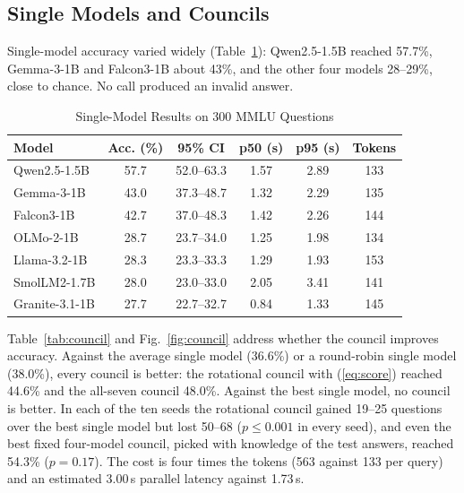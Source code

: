 \subsection{Single Models and Councils}
Single-model accuracy varied widely (Table~\ref{tab:models}): Qwen2.5-1.5B reached 57.7\%, Gemma-3-1B and Falcon3-1B about 43\%, and the other four models 28--29\%, close to chance. No call produced an invalid answer.

\begin{table}[t]
\caption{Single-Model Results on 300 MMLU Questions}
\label{tab:models}
\centering
\footnotesize
\setlength{\tabcolsep}{3.5pt}
\begin{tabular}{@{}lccccc@{}}
\toprule
Model & Acc. (\%) & 95\% CI & p50 (s) & p95 (s) & Tokens \\
\midrule
Qwen2.5-1.5B & 57.7 & 52.0--63.3 & 1.57 & 2.89 & 133 \\
Gemma-3-1B & 43.0 & 37.3--48.7 & 1.32 & 2.29 & 135 \\
Falcon3-1B & 42.7 & 37.0--48.3 & 1.42 & 2.26 & 144 \\
OLMo-2-1B & 28.7 & 23.7--34.0 & 1.25 & 1.98 & 134 \\
Llama-3.2-1B & 28.3 & 23.3--33.3 & 1.29 & 1.93 & 153 \\
SmolLM2-1.7B & 28.0 & 23.0--33.0 & 2.05 & 3.41 & 141 \\
Granite-3.1-1B & 27.7 & 22.7--32.7 & 0.84 & 1.33 & 145 \\
\bottomrule
\end{tabular}
\end{table}

Table~\ref{tab:council} and Fig.~\ref{fig:council} address whether the council improves accuracy. Against the average single model (36.6\%) or a round-robin single model (38.0\%), every council is better: the rotational council with (\ref{eq:score}) reached 44.6\% and the all-seven council 48.0\%. Against the best single model, no council is better. In each of the ten seeds the rotational council gained 19--25 questions over the best single model but lost 50--68 ($p\le0.001$ in every seed), and even the best fixed four-model council, picked with knowledge of the test answers, reached 54.3\% ($p=0.17$). The cost is four times the tokens (563 against 133 per query) and an estimated 3.00\,s parallel latency against 1.73\,s.

